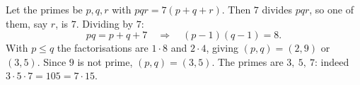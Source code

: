 Let the primes be $p,q,r$ with $pqr=7(p+q+r)$. Then $7$ divides $pqr$, so one of them, say $r$, is $7$. Dividing by $7$:
\[
pq=p+q+7\quad\Longrightarrow\quad (p-1)(q-1)=8 .
\]
With $p\le q$ the factorisations are $1\cdot8$ and $2\cdot4$, giving $(p,q)=(2,9)$ or $(3,5)$. Since $9$ is not prime, $(p,q)=(3,5)$. The primes are $\boxed{3,\ 5,\ 7}$: indeed $3\cdot5\cdot7=105=7\cdot15$.
